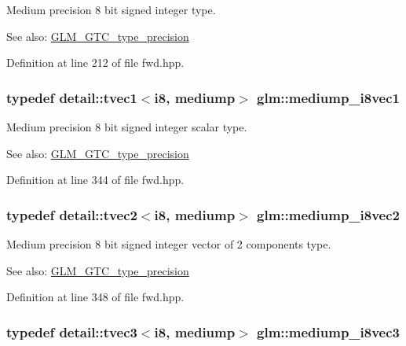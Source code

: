 Medium precision 8 bit signed integer type. \begin{Desc}
\item[See also:]\hyperlink{group__gtc__type__precision}{GLM\_\-GTC\_\-type\_\-precision} \end{Desc}


Definition at line 212 of file fwd.hpp.\hypertarget{group__gtc__type__precision_g820f8b497e06d518968d00761747c547}{
\subsubsection[mediump\_\-i8vec1]{\setlength{\rightskip}{0pt plus 5cm}typedef detail::tvec1$<$i8, mediump$>$ {\bf glm::mediump\_\-i8vec1}}}
\label{group__gtc__type__precision_g820f8b497e06d518968d00761747c547}


Medium precision 8 bit signed integer scalar type. \begin{Desc}
\item[See also:]\hyperlink{group__gtc__type__precision}{GLM\_\-GTC\_\-type\_\-precision} \end{Desc}


Definition at line 344 of file fwd.hpp.\hypertarget{group__gtc__type__precision_g38eba1ab306fe5cc5eeafa35ce5b5b26}{
\subsubsection[mediump\_\-i8vec2]{\setlength{\rightskip}{0pt plus 5cm}typedef detail::tvec2$<$i8, mediump$>$ {\bf glm::mediump\_\-i8vec2}}}
\label{group__gtc__type__precision_g38eba1ab306fe5cc5eeafa35ce5b5b26}


Medium precision 8 bit signed integer vector of 2 components type. \begin{Desc}
\item[See also:]\hyperlink{group__gtc__type__precision}{GLM\_\-GTC\_\-type\_\-precision} \end{Desc}


Definition at line 348 of file fwd.hpp.\hypertarget{group__gtc__type__precision_g91b40a693c1db26a7cc544339b326df3}{
\subsubsection[mediump\_\-i8vec3]{\setlength{\rightskip}{0pt plus 5cm}typedef detail::tvec3$<$i8, mediump$>$ {\bf glm::mediump\_\-i8vec3}}}
\label{group__gtc__type__precision_g91b40a693c1db26a7cc544339b326df3}


